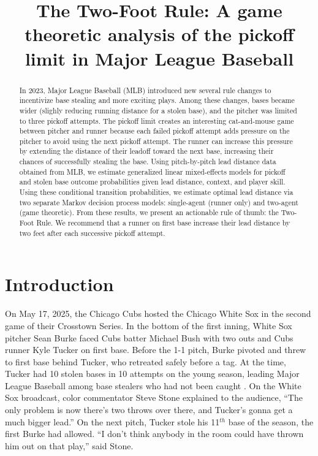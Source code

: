 \documentclass{article}
\title{The Two-Foot Rule: A game theoretic analysis of the pickoff limit in Major League Baseball}
\begin{document}
  \maketitle

  \begin{abstract}
    In 2023, Major League Baseball (MLB) introduced new several rule changes to incentivize base stealing and more exciting plays. Among these changes, bases became wider (slighly reducing running distance for a stolen base), and the pitcher was limited to three pickoff attempts. The pickoff limit creates an interesting cat-and-mouse game between pitcher and runner because each failed pickoff attempt adds pressure on the pitcher to avoid using the next pickoff attempt. The runner can increase this pressure by extending the distance of their leadoff toward the next base, increasing their chances of successfully stealing the base. Using pitch-by-pitch lead distance data obtained from MLB, we estimate generalized linear mixed-effects models for pickoff and stolen base outcome probabilities given lead distance, context, and player skill. Using these conditional transition probabilities, we estimate optimal lead distance via two separate Markov decision process models: single-agent (runner only) and two-agent (game theoretic). From these results, we present an actionable rule of thumb: the Two-Foot Rule. We recommend that a runner on first base increase their lead distance by two feet after each successive pickoff attempt.
  \end{abstract}

  \section{Introduction}
  \label{sec:introduction}

    On May 17, 2025, the Chicago Cubs hosted the Chicago White Sox in the second game of their Crosstown Series. In the bottom of the first inning, White Sox pitcher Sean Burke faced Cubs batter Michael Bush with two outs and Cubs runner Kyle Tucker on first base. Before the 1-1 pitch, Burke pivoted and threw to first base behind Tucker, who retreated safely before a tag. At the time, Tucker had 10 stolen bases in 10 attempts on the young season, leading Major League Baseball among base stealers who had not been caught \parencite{fangraphs_major_2025}. On the White Sox broadcast, color commentator Steve Stone explained to the audience, ``The only problem is now there's two throws over there, and Tucker's gonna get a much bigger lead.'' On the next pitch, Tucker stole his 11$^{th}$ base of the season, the first Burke had allowed. ``I don't think anybody in the room could have thrown him out on that play,'' said Stone.
\end{document}
